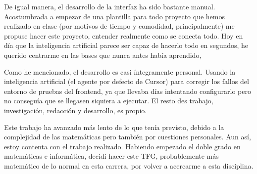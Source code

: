 De igual manera, el desarrollo de la interfaz ha sido bastante manual. Acostumbrada a empezar de una plantilla para todo proyecto que hemos realizado en clase (por motivos de tiempo y comodidad, principalmente) me propuse hacer este proyecto, entender realmente como se conecta todo. Hoy en día que la inteligencia artificial parece ser capaz de hacerlo todo en segundos, he querido centrarme en las bases que nunca antes había aprendido, 

Como he mencionado, el desarrollo es casi íntegramente personal. Usando la inteligencia artificial (el agente por defecto de Cursor) para corregir los fallos del entorno de pruebas del frontend, ya que llevaba días intentando configurarlo pero no conseguía que se llegasen siquiera a ejecutar. El resto des trabajo, investigación, redacción y desarrollo, es propio.

Este trabajo ha avanzado más lento de lo que tenía previsto, debido a la complejidad de las matemáticas pero también por cuestiones personales. Aun así, estoy contenta con el trabajo realizado. Habiendo empezado el doble grado en matemáticas e informática, decidí hacer este TFG, probablemente más matemático de lo normal en esta carrera, por volver a acercarme a esta disciplina. 